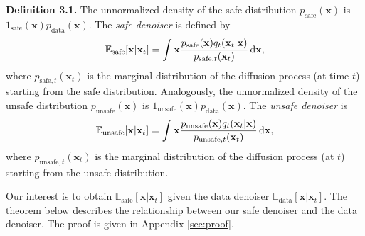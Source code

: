 \begin{mydefinitionbox}
\noindent\textbf{Definition 3.1.}\label{thm:def} The unnormalized density of the safe distribution $p_{\text{safe}}(\mathbf{x})$ is $1_{\text{safe}}(\mathbf{x})p_{\text{data}}(\mathbf{x})$. The \textit{safe denoiser} is defined by
    \begin{align*}
    \mathbb{E}_{\text{safe}}[\mathbf{x}\vert\mathbf{x}_{t}]=\int \mathbf{x}\frac{p_{\text{safe}}(\mathbf{x})q_{t}(\mathbf{x}_{t}\vert\mathbf{x})}{p_{\text{safe},t}(\mathbf{x}_{t})}\mathop{}\!\mathrm{d}\mathbf{x},
\end{align*}
where $p_{\text{safe},t}(\mathbf{x}_{t})$ is the marginal distribution of the diffusion process (at time $t$) starting from the safe distribution. Analogously, the unnormalized density of the unsafe distribution $p_{\text{unsafe}}(\mathbf{x})$ is $1_{\text{unsafe}}(\mathbf{x})p_{\text{data}}(\mathbf{x})$. The \textit{unsafe denoiser} is
\begin{align}\label{eq:E_unsafe}
    \mathbb{E}_{\text{unsafe}}[\mathbf{x}\vert\mathbf{x}_{t}]=\int \mathbf{x}\frac{p_{\text{unsafe}}(\mathbf{x})q_{t}(\mathbf{x}_{t}\vert\mathbf{x})}{p_{\text{unsafe},t}(\mathbf{x}_{t})}\mathop{}\!\mathrm{d}\mathbf{x},
\end{align}
where $p_{\text{unsafe},t}(\mathbf{x}_{t})$ is the marginal distribution of the diffusion process (at $t$) starting from the unsafe distribution.
\end{mydefinitionbox}



Our interest is to obtain $\mathbb{E}_{\text{safe}}[\mathbf{x}\vert\mathbf{x}_{t}]$ given the data denoiser $\mathbb{E}_{\text{data}}[\mathbf{x}\vert\mathbf{x}_{t}]$. The theorem below describes the relationship between our safe denoiser and the data denoiser. The proof is given in Appendix \ref{sec:proof}.

